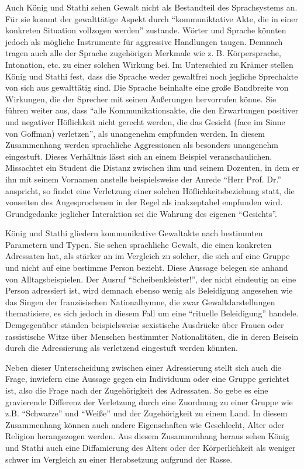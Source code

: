 Auch König und Stathi sehen Gewalt nicht als Bestandteil des Sprachsystems an.
Für sie kommt der gewalttätige Aspekt durch "`kommuniktative Akte, die in einer konkreten Situation vollzogen werden"'\cite[S. 47]{EK10} zustande.
Wörter und Sprache könnten jedoch als mögliche Instrumente für aggressive Handlungen taugen.
Demnach tragen auch alle der Sprache zugehörigen Merkmale wie z. B. Körpersprache, Intonation, etc. zu einer solchen Wirkung bei.
Im Unterschied zu Krämer stellen König und Stathi fest, dass die Sprache weder gewaltfrei noch jegliche Sprechakte von sich aus gewalttätig sind\cite[S. 48]{EK10}.
Die Sprache beinhalte eine große Bandbreite von Wirkungen, die der Sprecher mit seinen Äußerungen hervorrufen könne.
Sie führen weiter aus, dass "`alle Kommunikationsakte, die den Erwartungen positiver und negativer Höflichkeit nicht gerecht werden, die das Gesicht (face im Sinne von Goffman) verletzen"', als unangenehm empfunden werden.
In diesem Zusammenhang werden sprachliche Aggressionen als besonders unangenehm eingestuft.
Dieses Verhältnis lässt sich an einem Beispiel veranschaulichen.
Missachtet ein Student die Distanz zwischen ihm und seinem Dozenten, in dem er ihn mit seinem Vornamen anstelle beispielsweise der Anrede "`Herr Prof. Dr."' anspricht, so findet eine Verletzung einer solchen Höflichkeitsbeziehung statt, die vonseiten des Angesprochenen in der Regel als inakzeptabel empfunden wird.
Grundgedanke jeglicher Interaktion sei die Wahrung des eigenen "`Gesichts"'\cite[S. 50]{EK10}.

König und Stathi gliedern kommunikative Gewaltakte nach bestimmten Parametern und Typen.
Sie sehen sprachliche Gewalt, die einen konkreten Adressaten hat, als stärker an im Vergleich zu solcher, die sich auf eine Gruppe und nicht auf eine bestimme Person bezieht.
Diese Aussage belegen sie anhand von Alltagsbeispielen.
Der Ausruf "`Scheibenkleister!"', der nicht eindeutig an eine Person adressiert ist, wird demnach ebenso wenig als Beleidigung angesehen wie das Singen der französischen Nationalhymne, die zwar Gewaltdarstellungen thematisiere, es sich jedoch in diesem Fall um eine "`rituelle Beleidigung"' handele\cite[S. 51]{EK10}.
Demgegenüber ständen beispielsweise sexistische Ausdrücke über Frauen oder rassistische Witze über Menschen bestimmter Nationalitäten, die in deren Beisein durch die Adressierung als verletzend eingestuft werden könnten.

Neben dieser Unterscheidung zwischen einer Adressierung stellt sich auch die Frage, inwiefern eine Aussage gegen ein Individuum oder eine Gruppe gerichtet ist, also die Frage nach der Zugehörigkeit des Adressaten.
So gebe es eine gravierende Differenz der Verletzung durch eine Zuordnung zu einer Gruppe wie z.B. "`Schwarze"' und "`Weiße"' und der Zugehörigkeit zu einem Land.
In diesem Zusammenhang können auch andere Eigenschaften wie Geschlecht, Alter oder Religion herangezogen werden.
Aus diesem Zusammenhang heraus sehen König und Stathi auch eine Diffamierung des Alters oder der Körperlichkeit als weniger schwer im Vergleich zu einer Herabsetzung aufgrund der Rasse.

